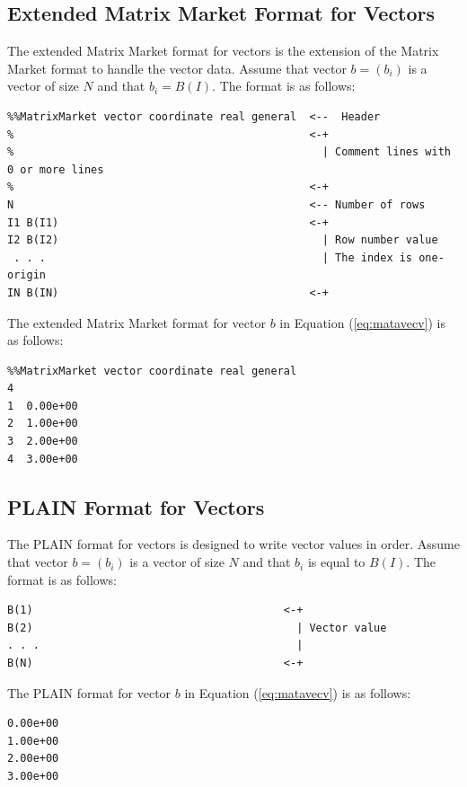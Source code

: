 \documentclass[a4paper]{article}
\begin{document}
\subsection{Extended Matrix Market Format for Vectors}
The extended Matrix Market format for vectors is 
the extension of the Matrix Market format to handle the vector data. 
Assume that vector $b=(b_{i})$ is a vector of size 
$N$ and that $b_{i} = B(I)$. The format is as follows:

{\small
\begin{verbatim}
%%MatrixMarket vector coordinate real general  <--  Header
%                                              <-+ 
%                                                | Comment lines with 0 or more lines
%                                              <-+
N                                              <-- Number of rows
I1 B(I1)                                       <-+
I2 B(I2)                                         | Row number value
 . . .                                           | The index is one-origin
IN B(IN)                                       <-+ 
\end{verbatim}
}

The extended Matrix Market format for vector $b$ in Equation (\ref{eq:matavecv}) is as follows:

{\small
\begin{verbatim}
%%MatrixMarket vector coordinate real general
4
1  0.00e+00
2  1.00e+00
3  2.00e+00
4  3.00e+00
\end{verbatim}
}

\subsection{PLAIN Format for Vectors}
The PLAIN format for vectors is designed to write vector values in
order. Assume that vector $b=(b_{i})$ is a vector of size $N$ and
that $b_{i}$ is equal to $B(I)$. The format is as follows:

{\small
\begin{verbatim}
B(1)                                       <-+
B(2)                                         | Vector value
. . .                                        | 
B(N)                                       <-+ 
\end{verbatim}
}

The PLAIN format for vector $b$ in Equation (\ref{eq:matavecv}) is as follows: 

{\small
\begin{verbatim}
0.00e+00
1.00e+00
2.00e+00
3.00e+00
\end{verbatim}
}
\end{document}
